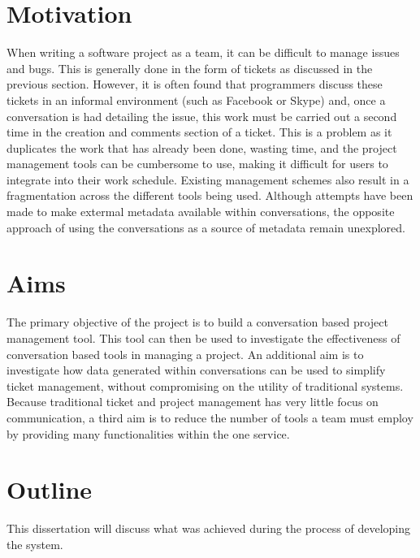 \documentclass[a4paper]{l3proj}
\begin{document}
\section{Motivation}
\label{motivation}

When writing a software project as a team, it can be difficult to manage issues and bugs. This is generally done in the form of tickets as discussed in the previous section. However, it is often found that programmers discuss these tickets in an informal environment (such as Facebook or Skype) and, once a conversation is had detailing the issue, this work must be carried out a second time in the creation and comments section of a ticket. This is a problem as it duplicates the work that has already been done, wasting time, and the project management tools can be cumbersome to use, making it difficult for users to integrate into their work schedule. Existing management schemes also result in a fragmentation across the different tools being used. Although attempts have been made to make extermal metadata available within conversations, the opposite approach of using the conversations as a source of metadata remain unexplored.

\section{Aims}
\label{aims}

The primary objective of the project is to build a conversation based project management tool.  This tool can then be used to investigate the effectiveness of conversation based tools in managing a project. An additional aim is to investigate how data generated within conversations can be used to simplify ticket management, without compromising on the utility of traditional systems. Because traditional ticket and project management has very little focus on communication, a third aim is to reduce the number of tools a team must employ by providing many functionalities within the one service.

\section{Outline}
\label{outline}

This dissertation will discuss what was achieved during the process of developing the system.
\end{document}
